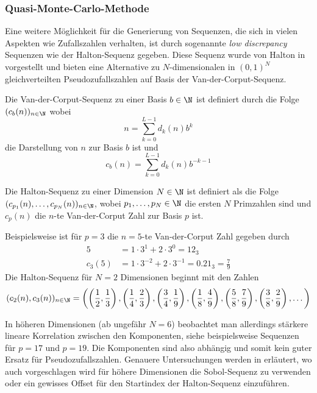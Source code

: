 \subsubsection*{Quasi-Monte-Carlo-Methode}
Eine weitere Möglichkeit für die Generierung von Sequenzen, die sich in vielen Aspekten wie Zufallszahlen verhalten, ist durch sogenannte \emph{low discrepancy} Sequenzen wie der Halton-Sequenz gegeben. Diese Sequenz wurde von Halton in \autocite{halton60} vorgestellt und bieten eine Alternative zu $N$-dimensionalen in $(0,1)^N$ gleichverteilten Pseudozufallszahlen auf Basis der Van-der-Corput-Sequenz.\\
\begin{mathdef}
Die Van-der-Corput-Sequenz zu einer Basis $b\in\N$ ist definiert durch die Folge $(c_b(n))_{n\in\N}$ wobei
\begin{equation*}
n=\sum_{k=0}^{L-1}d_k(n)b^k
\end{equation*}
die Darstellung von $n$ zur Basis $b$ ist und
\begin{equation*}
c_b(n)=\sum_{k=0}^{L-1}d_k(n)b^{-k-1}
\end{equation*}
\end{mathdef}
\begin{mathdef}
Die Halton-Sequenz zu einer Dimension $N\in\N$ ist definiert als die Folge $(c_{p_1}(n),\dots,c_{p_N}(n))_{n\in\N}$, wobei $p_1,\dots,p_N\in\N$ die ersten $N$ Primzahlen sind und $c_p(n)$ die $n$-te Van-der-Corput Zahl zur Basis $p$ ist.
\end{mathdef}
\begin{mathbsp}
Beispielsweise ist für $p=3$ die $n=5$-te Van-der-Corput Zahl gegeben durch 
\begin{align*}
5&=1\cdot 3^1+2\cdot 3^0=12_3\\
c_3(5)&=1\cdot 3^{-2}+2\cdot 3^{-1}=0.21_3=\frac{7}{9}
\end{align*}
Die Halton-Sequenz für $N=2$ Dimensionen beginnt mit den Zahlen
\begin{equation*}
(c_2(n),c_3(n))_{n\in\N}=\left(\left(\frac{1}{2},\frac{1}{3}\right),\left(\frac{1}{4},\frac{2}{3}\right),\left(\frac{3}{4},\frac{1}{9}\right),\left(\frac{1}{8},\frac{4}{9}\right),\left(\frac{5}{8},\frac{7}{9}\right),\left(\frac{3}{8},\frac{2}{9}\right),\dots\right)
\end{equation*}
\end{mathbsp}
In höheren Dimensionen (ab ungefähr $N=6$) beobachtet man allerdings stärkere lineare Korrelation zwischen den Komponenten, siehe beispielsweise Sequenzen für $p=17$ und $p=19$. Die Komponenten sind also abhängig und somit kein guter Ersatz für Pseudozufallszahlen. Genauere Untersuchungen werden in \autocite{Morokoff1995218} erläutert, wo auch vorgeschlagen wird für höhere Dimensionen die Sobol-Sequenz zu verwenden oder ein gewisses Offset für den Startindex der Halton-Sequenz einzuführen.\\
